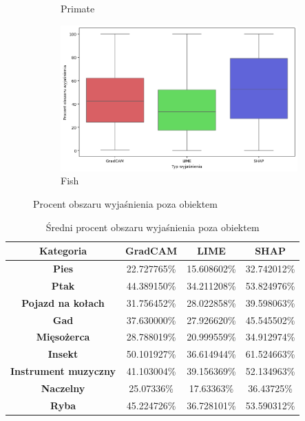 \begin{figure}[h]
\begin{subfigure}[b]{0.3\textwidth}
		\caption{Primate}
	\end{subfigure}
	\begin{subfigure}[b]{0.3\textwidth}
		\centering\includegraphics[width=.9\textwidth]{img/areaincorrect_fish}
		\caption{Fish}
	\end{subfigure}
	\caption{Procent obszaru wyjaśnienia poza obiektem}
	\label{rys:areaincorrect_category}
\end{figure}

\begin{table}[h]
	\centering
	\begin{tabular}{|c|c|c|c|}
		\hline
		\textbf{Kategoria}           & \textbf{GradCAM} & \textbf{LIME} & \textbf{SHAP} \\
		\hline
		\textbf{Pies}                & 22.727765\%      & 15.608602\%   & 32.742012\%   \\
		\hline
		\textbf{Ptak}                & 44.389150\%      & 34.211208\%   & 53.824976\%   \\
		\hline
		\textbf{Pojazd na kołach}    & 31.756452\%      & 28.022858\%   & 39.598063\%   \\
		\hline
		\textbf{Gad}                 & 37.630000\%      & 27.926620\%   & 45.545502\%   \\
		\hline
		\textbf{Mięsożerca}          & 28.788019\%      & 20.999559\%   & 34.912974\%   \\
		\hline
		\textbf{Insekt}              & 50.101927\%      & 36.614944\%   & 61.524663\%   \\
		\hline
		\textbf{Instrument muzyczny} & 41.103004\%      & 39.156369\%   & 52.134963\%   \\
		\hline
		\textbf{Naczelny}            & 25.07336\%       & 17.63363\%    & 36.43725\%    \\
		\hline
		\textbf{Ryba}                & 45.224726\%      & 36.728101\%   & 53.590312\%   \\
		\hline
	\end{tabular}
	\caption{Średni procent obszaru wyjaśnienia poza obiektem}
	\label{tab:areaincorrect_category}
\end{table}

